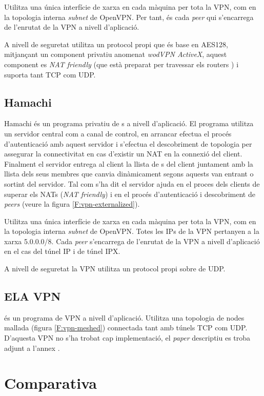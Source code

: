 Utilitza una única interfície de xarxa en cada màquina per tota la VPN, com en la topologia interna \emph{subnet} de OpenVPN. Per tant, és cada \emph{peer} qui s'encarrega de l'enrutat de la VPN a nivell d'aplicació.

A nivell de seguretat utilitza un protocol propi que és base en AES128, mitjançant un component privatiu anomenat \emph{wodVPN ActiveX}, aquest component es \emph{NAT friendly} (que està preparat per travessar els routers ) i suporta tant TCP com UDP.

\subsection{Hamachi}
Hamachi és un programa privatiu de s a nivell d'aplicació. El programa utilitza un servidor central com a canal de control, en arrancar efectua el procés d'autenticació amb aquest servidor i s'efectua el descobriment de topologia per assegurar la connectivitat en cas d'existir un NAT en la connexió del client. Finalment el servidor entrega al client la llista de s del client juntament amb la llista dels seus membres que canvia dinàmicament segons aquests van entrant o sortint del servidor. Tal com s'ha dit el servidor ajuda en el proces dels clients de superar els NATs (\emph{NAT friendly}) i en el procés d'autenticació i descobriment de \emph{peers} (veure la figura \ref{F:vpn-externalized}).

Utilitza una única interfície de xarxa en cada màquina per tota la VPN, com en la topologia interna \emph{subnet} de OpenVPN. Totes les IPs de la VPN pertanyen a la xarxa 5.0.0.0/8. Cada \emph{peer} s'encarrega de l'enrutat de la VPN a nivell d'aplicació en el cas del túnel IP i de túnel IPX.

A nivell de seguretat la VPN utilitza un protocol propi sobre de UDP.

\subsection{ELA VPN}
 és un programa de VPN a nivell d'aplicació.
Utilitza una topologia de nodes mallada (figura \ref{F:vpn-meshed}) connectada tant amb túnels TCP com UDP.
D'aquesta VPN no s'ha trobat cap implementació, el \emph{paper} descriptiu es troba adjunt a l'annex .
\section{Comparativa}
